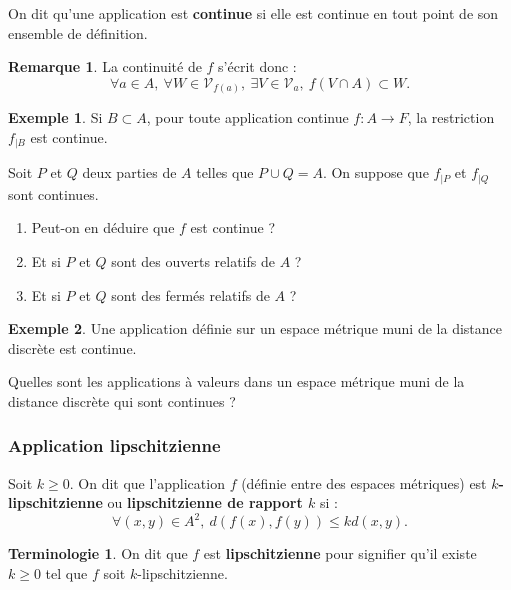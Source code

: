 \documentclass[french]{article}
\theoremstyle{plain}
\theoremstyle{definition}
\newtheorem*{ex}{Exemple}
\newtheorem*{rmq}{Remarque}
\newtheorem*{terminologie}{Terminologie}
\theoremstyle{remark}
\begin{document}
\begin{dfn}
	On dit qu'une application est \textbf{continue} si elle est continue en tout point de son ensemble de définition.
\end{dfn}

\begin{rmq}
	La continuité de $f$ s'écrit donc : $$\forall a\in A,\ \forall W\in\mathcal{V}_{f(a)},\ \exists V\in\mathcal{V}_a,\ f(V\cap A)\subset W.$$
\end{rmq}

\begin{ex}
	Si $B\subset A$, pour toute application continue $f:A\to F$, la restriction $f_{\mid B}$ est continue.
\end{ex}

\begin{exo}
	Soit $P$ et $Q$ deux parties de $A$ telles que $P\cup Q=A$. On suppose que $f_{\mid P}$ et $f_{\mid Q}$ sont continues.
	\begin{enumerate}
		\item Peut-on en déduire que $f$ est continue ?
		\item Et si $P$ et $Q$ sont des ouverts relatifs de $A$ ?
		\item Et si $P$ et $Q$ sont des fermés relatifs de $A$ ?
	\end{enumerate}
\end{exo}

\begin{ex}
	Une application définie sur un espace métrique muni de la distance discrète est continue.
\end{ex}

\begin{exo}
	Quelles sont les applications à valeurs dans un espace métrique muni de la distance discrète qui sont continues ?
\end{exo}

\subsubsection*{Application lipschitzienne}

\begin{dfn}
	Soit $k\geqslant0$. On dit que l'application $f$ (définie entre des espaces métriques) est \textbf{$k$-lipschitzienne} ou \textbf{lipschitzienne de rapport $k$} si : $$\forall (x,y)\in A^2,\ d(f(x),f(y))\leqslant k d(x,y).$$
\end{dfn}

\begin{terminologie}
	On dit que $f$ est \textbf{lipschitzienne} pour signifier qu'il existe $k\geqslant 0$ tel que $f$ soit $k$-lipschitzienne.
\end{terminologie}
\end{document}
